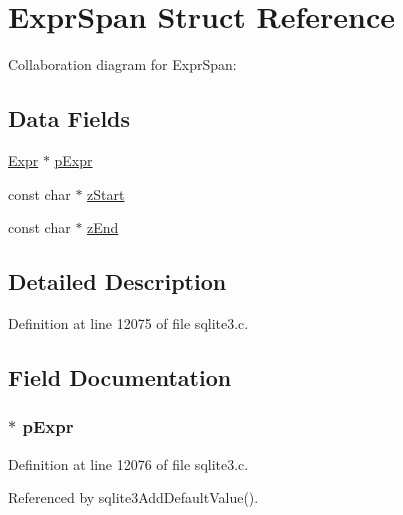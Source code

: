 \hypertarget{struct_expr_span}{}\section{Expr\+Span Struct Reference}
\label{struct_expr_span}


Collaboration diagram for Expr\+Span\+:
\subsection*{Data Fields}
\begin{DoxyCompactItemize}
\item 
\hyperlink{struct_expr}{Expr} $\ast$ \hyperlink{struct_expr_span_aab4193f0accd02e4c2e5e60e105c03ca}{p\+Expr}
\item 
const char $\ast$ \hyperlink{struct_expr_span_a17ad559b98c2b8eb2c1a2ecb5d6d3016}{z\+Start}
\item 
const char $\ast$ \hyperlink{struct_expr_span_a92cfd0f58cabf6a41ef1173a73a6dc5c}{z\+End}
\end{DoxyCompactItemize}


\subsection{Detailed Description}


Definition at line 12075 of file sqlite3.\+c.



\subsection{Field Documentation}
\hypertarget{struct_expr_span_aab4193f0accd02e4c2e5e60e105c03ca}{}
\subsubsection[{p\+Expr}]{$\ast$ p\+Expr}\label{struct_expr_span_aab4193f0accd02e4c2e5e60e105c03ca}


Definition at line 12076 of file sqlite3.\+c.



Referenced by sqlite3\+Add\+Default\+Value().

\hypertarget{struct_expr_span_a92cfd0f58cabf6a41ef1173a73a6dc5c}{}
